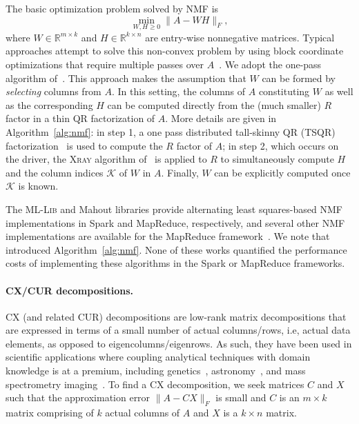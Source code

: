 The basic optimization problem solved by NMF is
\begin{equation}
\min_{W,H \geq 0} \|A - WH\|_F,
\end{equation}
where $W \in \mathbb{R}^{m \times k}$ and $H \in \mathbb{R}^{k \times n}$ are entry-wise nonnegative matrices. Typical approaches attempt to solve this non-convex problem by using block coordinate optimizations that require multiple passes over $A$~\cite{kim2014algorithms}. We adopt the one-pass algorithm of~\cite{benson2014scalable}. This approach makes the assumption that $W$ can be formed by {\it selecting} columns from $A$. In this setting, the columns of $A$ constituting $W$ as well as the corresponding $H$ can be computed directly from the (much smaller) $R$ factor in a thin QR factorization of $A$. More details are given in Algorithm~\ref{alg:nmf}: in step 1, a one pass distributed tall-skinny QR (\textsc{TSQR}) factorization~\cite{demmel12} is used to compute the $R$ factor of $A$; in step 2, which occurs on the driver, the \textsc{Xray} algorithm of~\cite{kumar13} is applied to $R$ to simultaneously compute $H$ and the column indices $\mathcal{K}$ of $W$ in $A$. Finally, $W$ can be explicitly computed once $\mathcal{K}$ is known.

The \textsc{ML-Lib} and Mahout libraries provide alternating least squares-based NMF implementations in Spark and MapReduce, respectively, and several other NMF implementations are available for the MapReduce framework~\cite{liu2010distributed,Liao201448,benson2014scalable}. We note that~\cite{benson2014scalable} introduced Algorithm~\ref{alg:nmf}. None of these works quantified the performance costs of implementing these algorithms in the Spark or MapReduce frameworks.

\paragraph{CX/CUR decompositions.}
CX (and related CUR) decompositions are
low-rank matrix decompositions that are expressed in terms of a small number of actual columns/rows, i.e, actual data elements, as opposed to eigencolumns/eigenrows.  
As such, they have been used in scientific applications where coupling analytical techniques with domain knowledge is at a premium, including
genetics~\cite{Paschou07b}, astronomy~\cite{Yip14-AJ}, and mass spectrometry imaging~\cite{YRPMB15}. To find a CX decomposition, we seek matrices $C$ and $X$ such that the approximation error $\|A-CX\|_F$ is small and $C$ is an $m\times k$ matrix comprising of $k$
actual columns of $A$ and $X$ is a $k \times n$ matrix.

